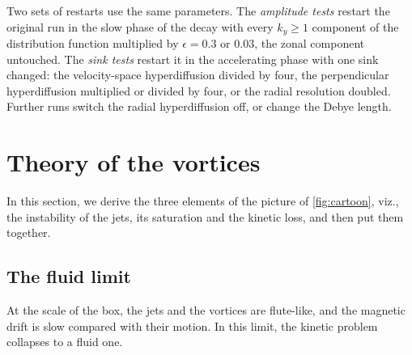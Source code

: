 \documentclass{jpp}
\begin{document}
Two sets of restarts use the same parameters. The \textit{amplitude tests} restart the original run in the slow phase of the decay with every \(k_y \geq 1\) component of the distribution function multiplied by \(\epsilon = 0.3\) or \(0.03\), the zonal component untouched. The \textit{sink tests} restart it in the accelerating phase with one sink changed: the velocity-space hyperdiffusion divided by four, the perpendicular hyperdiffusion multiplied or divided by four, or the radial resolution doubled. Further runs switch the radial hyperdiffusion off, or change the Debye length.

\section{Theory of the vortices}\label{sec:theory}

In this section, we derive the three elements of the picture of \cref{fig:cartoon}, viz., the instability of the jets, its saturation and the kinetic loss, and then put them together.

\subsection{The fluid limit}\label{sec:euler}

At the scale of the box, the jets and the vortices are flute-like, and the magnetic drift is slow compared with their motion. In this limit, the kinetic problem collapses to a fluid one.
\end{document}
